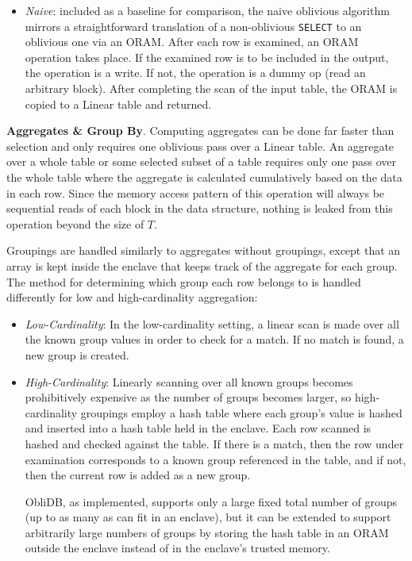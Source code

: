 \documentclass[letterpaper,twocolumn,10pt]{article}
\def\name/{ObliDB}
\begin{document}
\begin{itemize}[itemsep=0pt,parsep=0pt]
\item \textit{Naive}: included as a baseline for comparison, the naive oblivious algorithm mirrors a straightforward translation of a non-oblivious \texttt{SELECT} to an oblivious one via an ORAM. After each row is examined, an ORAM operation takes place. If the examined row is to be included in the output, the operation is a write. If not, the operation is a dummy op (read an arbitrary block). After completing the scan of the input table, the ORAM is copied to a Linear table and returned.
\end{itemize}

  \noindent \textbf{Aggregates \& Group By}. 
Computing aggregates can be done far faster than selection and only requires one oblivious pass over a Linear table. An aggregate over a whole table or some selected subset of a table requires only one pass over the whole table where the aggregate is calculated cumulatively based on the data in each row. Since the memory access pattern of this operation will always be sequential reads of each block in the data structure, nothing is leaked from this operation beyond the size of $T$. 

Groupings are handled similarly to aggregates without groupings, except that an array is kept inside the enclave that keeps track of the aggregate for each group. The method for determining which group each row belongs to is handled differently for low and high-cardinality aggregation:
\begin{itemize}[itemsep=0pt,parsep=0pt]
\item \textit{Low-Cardinality}: In the low-cardinality setting, a linear scan is made over all the known group values in order to check for a match. If no match is found, a new group is created. 

\item \textit{High-Cardinality}: Linearly scanning over all known groups becomes prohibitively expensive as the number of groups becomes larger, so high-cardinality groupings employ a hash table where each group's value is hashed and inserted into a hash table held in the enclave. Each row scanned is hashed and checked against the table. If there is a match, then the row under examination corresponds to a known group referenced in the table, and if not, then the current row is added as a new group. 

\name/, as implemented, supports only a large fixed total number of groups (up to as many as can fit in an enclave), but it can be extended to support arbitrarily large numbers of groups by storing the hash table in an ORAM outside the enclave instead of in the enclave's trusted memory. 
\end{itemize}
\end{document}
